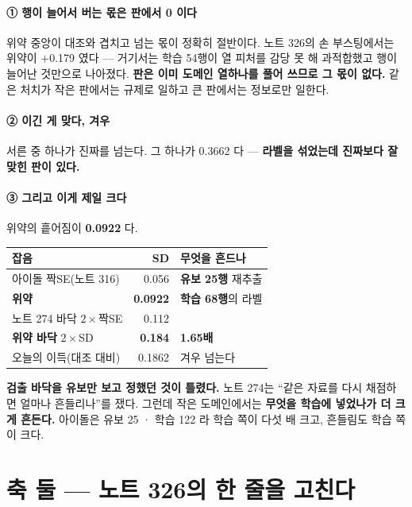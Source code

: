 \documentclass[10pt]{article}
\begin{document}
\paragraph{① 행이 늘어서 버는 몫은 판에서 0 이다} 위약 중앙이 대조와
겹치고 넘는 몫이 정확히 절반이다. 노트 326의 손 부스팅에서는 위약이
$+$0.179 였다 --- 거기서는 학습 54행이 열 피처를 감당 못 해 과적합했고
행이 늘어난 것만으로 나아졌다. \textbf{판은 이미 도메인 열하나를 풀어
쓰므로 그 몫이 없다.} 같은 처치가 작은 판에서는 규제로 일하고 큰 판에서는
정보로만 일한다.

\paragraph{② 이긴 게 맞다, 겨우} 서른 중 하나가 진짜를 넘는다. 그 하나가
0.3662 다 --- \textbf{라벨을 섞었는데 진짜보다 잘 맞힌 판이 있다.}

\paragraph{③ 그리고 이게 제일 크다} 위약의 흩어짐이 \textbf{0.0922} 다.

\begin{center}\small
\begin{tabular}{lrl}
\hline
잡음 & SD & 무엇을 흔드나 \\
\hline
아이돌 짝SE(노트 316) & 0.056 & \textbf{유보 25행} 재추출 \\
\textbf{위약} & \textbf{0.0922} & \textbf{학습 68행}의 라벨 \\
\hline
노트 274 바닥 $2{\times}$짝SE & 0.112 & \\
\textbf{위약 바닥} $2{\times}$SD & \textbf{0.184} & \textbf{1.65배} \\
\hline
오늘의 이득(대조 대비) & 0.1862 & 겨우 넘는다 \\
\hline
\end{tabular}
\end{center}

\textbf{검출 바닥을 유보만 보고 정했던 것이 틀렸다.} 노트 274는 ``같은
자료를 다시 채점하면 얼마나 흔들리나''를 쟀다. 그런데 작은 도메인에서는
\textbf{무엇을 학습에 넣었나가 더 크게 흔든다.} 아이돌은 유보 25 · 학습
122 라 학습 쪽이 다섯 배 크고, 흔들림도 학습 쪽이 크다.

\section{축 둘 --- 노트 326의 한 줄을 고친다}
\end{document}
